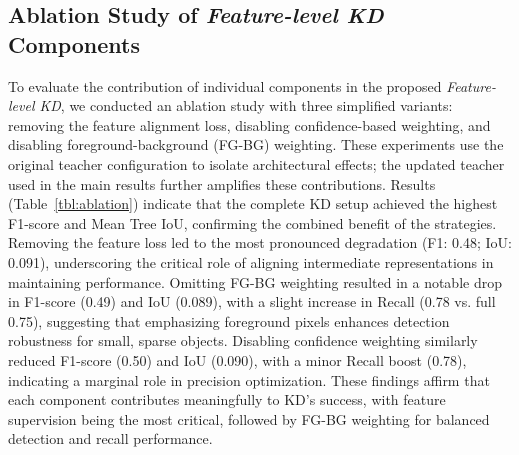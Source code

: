 \documentclass[twocolumn]{article}
\begin{document}
\subsection{Ablation Study of \textit{Feature-level KD} Components}

To evaluate the contribution of individual components in the proposed \textit{Feature-level KD}, we conducted an ablation study with three simplified variants: removing the feature alignment loss, disabling confidence-based weighting, and disabling foreground-background (FG-BG) weighting. These experiments use the original teacher configuration to isolate architectural effects; the updated teacher used in the main results further amplifies these contributions. Results (Table~\ref{tbl:ablation}) indicate that the complete KD setup achieved the highest F1-score and Mean Tree IoU, confirming the combined benefit of the strategies. Removing the feature loss led to the most pronounced degradation (F1: 0.48; IoU: 0.091), underscoring the critical role of aligning intermediate representations in maintaining performance. Omitting FG-BG weighting resulted in a notable drop in F1-score (0.49) and IoU (0.089), with a slight increase in Recall (0.78 vs. full 0.75), suggesting that emphasizing foreground pixels enhances detection robustness for small, sparse objects. Disabling confidence weighting similarly reduced F1-score (0.50) and IoU (0.090), with a minor Recall boost (0.78), indicating a marginal role in precision optimization. These findings affirm that each component contributes meaningfully to KD's success, with feature supervision being the most critical, followed by FG-BG weighting for balanced detection and recall performance.
\end{document}
